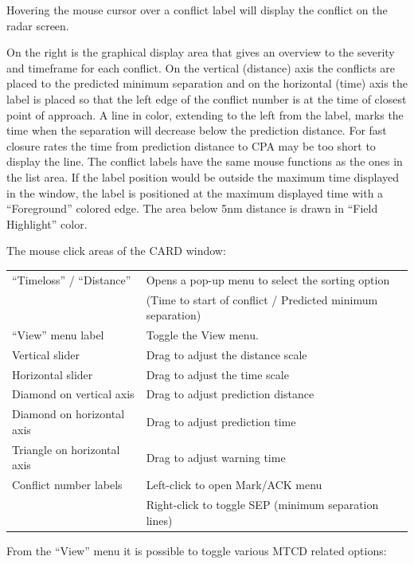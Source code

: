 \documentclass[11pt,a4paper,oldfontcommands]{memoir}
\newcommand{\colorref}[1]{\textit{\hyperref[#1]{\StrDel{#1}{color:}}}}
\begin{document}
Hovering the mouse cursor over a conflict label will display the conflict on the radar screen.

On the right is the graphical display area that gives an overview to the severity and timeframe for each conflict. On the vertical (distance) axis the conflicts are placed to the predicted minimum separation and on the horizontal (time) axis the label is placed so that the left edge of the conflict number is at the time of closest point of approach. A line in \colorref{color:CARD Time Vector} color, extending to the left from the label, marks the time when the separation will decrease below the prediction distance. For fast closure rates the time from prediction distance to CPA may be too short to display the line. The conflict labels have the same mouse functions as the ones in the list area. If the label position would be outside the maximum time displayed in the window, the label is positioned at the maximum displayed time with a “Foreground” colored edge.
The area below 5nm distance is drawn in “Field Highlight” color.

The mouse click areas of the CARD window:

\begin{tabular}{l l}
    “Timeloss” / “Distance”     & Opens a pop-up menu to select the sorting option\\
                                & (Time to start of conflict / Predicted minimum separation)\\
    “View” menu label           & Toggle the View menu.\\
    Vertical slider             & Drag to adjust the distance scale\\
    Horizontal slider           & Drag to adjust the time scale\\
    Diamond on vertical axis    & Drag to adjust prediction distance    \\
    Diamond on horizontal axis  & Drag to adjust prediction time\\
    Triangle on horizontal axis & Drag to adjust warning time\\
    Conflict number labels      & Left-click to open Mark/ACK menu\\
                                & Right-click to toggle SEP (minimum separation lines)\\
\end{tabular}

From the “View” menu it is possible to toggle various MTCD related options:
\end{document}

